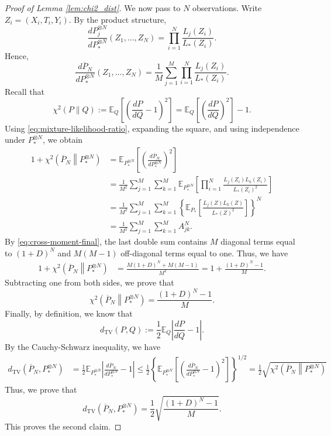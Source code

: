 \documentclass[10pt,a4paper]{amsart}
\begin{document}
\begin{proof}[Proof of Lemma \ref{lem:chi2_dist}]
We now pass to \(N\) observations.  Write
\(Z_i=(X_i,T_i,Y_i)\).  By the product structure,
\[
\frac{dP_j^{\otimes N}}{dP_*^{\otimes N}}(Z_1,\ldots,Z_N)
=
\prod_{i=1}^N\frac{L_j(Z_i)}{L_*(Z_i)}.
\]
Hence,
\begin{equation}
\frac{d\overline P_N}{dP_*^{\otimes N}}(Z_1,\ldots,Z_N)
=
\frac1M\sum_{j=1}^M
\prod_{i=1}^N\frac{L_j(Z_i)}{L_*(Z_i)}.
\label{eq:mixture-likelihood-ratio}
\end{equation}
Recall that
\[
\chi^2(P\|Q)
:=
\mathbb E_Q
\left[
\left(\frac{dP}{dQ}-1\right)^2
\right]
=
\mathbb E_Q
\left[
\left(\frac{dP}{dQ}\right)^2
\right]-1.
\]
Using \eqref{eq:mixture-likelihood-ratio}, expanding the square, and using
independence under \(P_*^{\otimes N}\), we obtain
\begin{align}
1+
\chi^2\!\left(\overline P_N\middle\|P_*^{\otimes N}\right)
&=
\mathbb E_{P_*^{\otimes N}}
\left[
\left(
\frac{d\overline P_N}{dP_*^{\otimes N}}
\right)^2
\right] \nonumber\\
&=
\frac1{M^2}
\sum_{j=1}^M\sum_{k=1}^M
\mathbb E_{P_*^{\otimes N}}
\left[
\prod_{i=1}^N
\frac{L_j(Z_i)L_k(Z_i)}{L_*(Z_i)^2}
\right]
\nonumber\\
&=
\frac1{M^2}
\sum_{j=1}^M\sum_{k=1}^M
\left\{
\mathbb E_{P_*}
\left[
\frac{L_j(Z)L_k(Z)}{L_*(Z)^2}
\right]
\right\}^{N}
\nonumber\\
&=
\frac1{M^2}
\sum_{j=1}^M\sum_{k=1}^M A_{jk}^N.
\label{eq:mixture-second-moment}
\end{align}
By \eqref{eq:cross-moment-final}, the last double sum contains \(M\)
diagonal terms equal to \((1+D)^N\) and \(M(M-1)\) off-diagonal terms
equal to one.  Thus, we have
\begin{align*}
1+
\chi^2\!\left(\overline P_N\middle\|P_*^{\otimes N}\right)
&=
\frac{M(1+D)^N+M(M-1)}{M^2}
=
1+\frac{(1+D)^N-1}{M}.
\end{align*}
Subtracting one from both sides, we prove that
\[
\chi^2\!\left(\overline P_N\middle\|P_*^{\otimes N}\right)
=
\frac{(1+D)^N-1}{M}.
\]
Finally, by definition, we know that
\[
d_{\mathrm{TV}}(P,Q)
:=
\frac12
\mathbb E_Q
\left|
\frac{dP}{dQ}-1
\right|.
\]
By the Cauchy-Schwarz inequality, we have
\begin{align*}
d_{\mathrm{TV}}\!\left(\overline P_N,P_*^{\otimes N}\right)
&=
\frac12
\mathbb E_{P_*^{\otimes N}}
\left|
\frac{d\overline P_N}{dP_*^{\otimes N}}-1
\right|
\leq
\frac12
\left\{
\mathbb E_{P_*^{\otimes N}}
\left[
\left(
\frac{d\overline P_N}{dP_*^{\otimes N}}-1
\right)^2
\right]
\right\}^{1/2}
=
\frac12
\sqrt{
\chi^2\!\left(\overline P_N\middle\|P_*^{\otimes N}\right)
}
\end{align*}
Thus, we prove that
\[
d_{\mathrm{TV}}\!\left(\overline P_N,P_*^{\otimes N}\right)=
\frac12
\sqrt{\frac{(1+D)^N-1}{M}}.
\]
This proves the second claim.
\end{proof}
\end{document}
